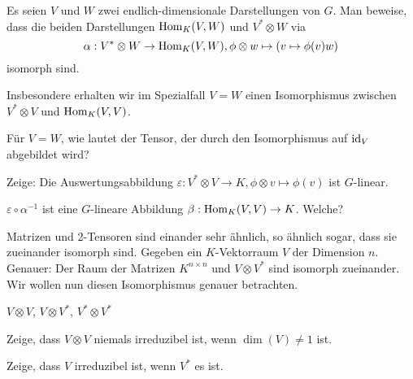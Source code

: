 \begin{sheet}
\begin{problem}[title={Isomorphismus zwischen Tensorprodukt und linearen Abbildungen}]\label{ex:hom_tensor_isomorphismus}
\begin{subproblem}
Es seien $V$ und $W$ zwei endlich-dimensionale Darstellungen von $G$. Man beweise, dass die beiden Darstellungen $\operatorname{Hom}_K(V,W)$ und $V^\ast \otimes W$ via
\[\alpha: V^\ast \otimes W \to \operatorname{Hom}_K(V,W), \phi \otimes w \mapsto (v\mapsto \phi(v)w)\]
isomorph sind.
\end{subproblem}

Insbesondere erhalten wir im Spezialfall $V=W$ einen Isomorphismus zwischen $V^\ast\otimes V$ und $\operatorname{Hom}_K(V,V)$.

\begin{subproblem}
Für $V=W$, wie lautet der Tensor, der durch den Isomorphismus auf $\operatorname{id}_V$ abgebildet wird?
\end{subproblem}

\begin{subproblem}
Zeige: Die Auswertungsabbildung $\varepsilon: V^\ast \otimes V \to K, \phi\otimes v\mapsto \phi(v)$ ist $G$-linear.
\end{subproblem}

\begin{subproblem}
$\varepsilon\circ\alpha^{-1}$ ist eine $G$-lineare Abbildung $\beta: \operatorname{Hom}_K(V,V) \to K$. Welche?
\end{subproblem}
\begin{subproblem}
	Matrizen und 2-Tensoren sind einander sehr ähnlich, so ähnlich sogar, dass sie zueinander isomorph sind. Gegeben ein $K$-Vektorraum $V$ der Dimension $n$. Genauer: Der Raum der Matrizen $K^{n\times n}$ und $V\otimes V^\ast$ sind isomorph zueinander. Wir wollen nun diesen Isomorphismus genauer betrachten.
	
	$V\otimes V$, $V\otimes V^\ast$, $V^\ast \otimes V^\ast$
\end{subproblem}
\end{problem}


\begin{problem}[title={Irreduzibilität von $V\otimes V$}]
Zeige, dass $V\otimes V$ niemals irreduzibel ist, wenn $\dim(V) \neq 1$ ist.
\end{problem}

\begin{problem}[title={Irreduzibilität von $V*\implies$ Irreduzibilität von $V$?}]
Zeige, dass $V$ irreduzibel ist, wenn $V^\ast$ es ist.
\end{problem}


\end{sheet}
